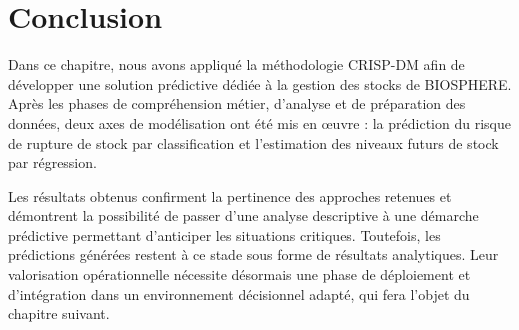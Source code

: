 \section{Conclusion}
 
Dans ce chapitre, nous avons appliqué la méthodologie CRISP-DM afin de développer une solution prédictive dédiée à la gestion des stocks de BIOSPHERE. Après les phases de compréhension métier, d'analyse et de préparation des données, deux axes de modélisation ont été mis en œuvre : la prédiction du risque de rupture de stock par classification et l'estimation des niveaux futurs de stock par régression.
 
Les résultats obtenus confirment la pertinence des approches retenues et démontrent la possibilité de passer d'une analyse descriptive à une démarche prédictive permettant d'anticiper les situations critiques. Toutefois, les prédictions générées restent à ce stade sous forme de résultats analytiques. Leur valorisation opérationnelle nécessite désormais une phase de déploiement et d'intégration dans un environnement décisionnel adapté, qui fera l'objet du chapitre suivant.